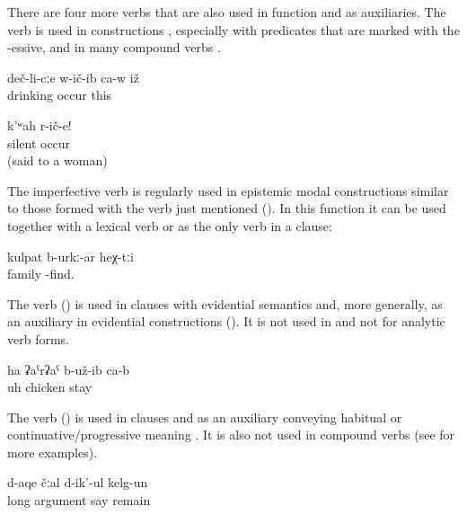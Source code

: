 There are four more verbs that are also used in  function and as auxiliaries. The verb   is used in  constructions , especially with predicates that are marked with the -essive, and in many compound verbs .
%
\begin{exe}
	\ex	\label{ex:He became a drinker}
	\gll	deč-li-cːe	w-ič-ib	ca-w	iž\\
		drinking	occur		this\\
	\glt	{}

	\ex	\label{ex:Be silent}
	\gll	k'ʷah	r-ič-e!\\
		silent	occur\\
	\glt	{} (said to a woman)
\end{exe}

The imperfective verb   is regularly used in epistemic modal constructions similar to those formed with the verb   just mentioned (). In this function it can be used together with a lexical verb or as the only verb in a  clause: 

\begin{exe}
	\ex	\label{They are probably a family.COP}
	\gll	kulpat	b-urkː-ar			heχ-tːi\\
		family	-find.	\\
	\glt	{}
\end{exe}

The verb  ()  is used in  clauses with evidential semantics  and, more generally, as an auxiliary in evidential constructions (). It is not used in  and not for analytic verb forms.
%
\begin{exe}
	\ex	\label{ex:Ah, it turned out to be a chicken}
	\gll	ha	ʡaˁrʡaˁ	b-už-ib	ca-b\\
		uh	chicken	stay	\\
	\glt	{}
\end{exe}

The verb  ()  is used in  clauses and as an auxiliary conveying habitual or continuative\slash progressive meaning . It is also not used in compound verbs (see  for more examples).
%
\begin{exe}
	\ex	\label{ex:‎‎They were arguing for a long time}
	\gll	d-aqe	čːal	d-ik'-ul	kelg-un\\
		long	argument	say	remain\\
	\glt	{}
\end{exe}
